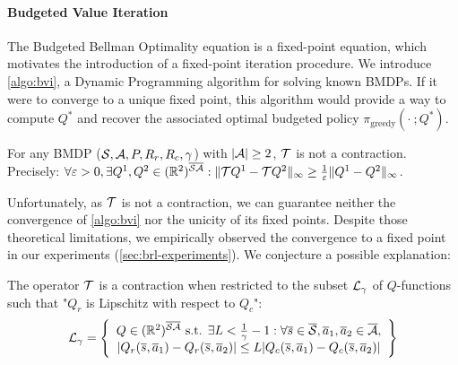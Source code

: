 \paragraph{Budgeted Value Iteration}

The Budgeted Bellman Optimality equation is a fixed-point equation, which motivates the introduction of a fixed-point iteration procedure. We introduce \autoref{algo:bvi}, a Dynamic Programming algorithm for solving known BMDPs. If it were to converge to a unique fixed point, this algorithm would provide a way to compute $Q^*$ and recover the associated optimal budgeted policy $\pi_\text{greedy}(\cdot~; Q^*)$.

\begin{theorem}
	\begin{leftbar}[theorembar]
	\label{thm:contraction}
	For any BMDP ($\mathcal{S},\mathcal{A},P,R_r,R_c,\gamma$) with $|\mathcal{A}| \geq 2$, $\mathcal{T}$ is not a contraction. Precisely: $\forall\varepsilon>0, \exists Q^1,Q^2\in(\mathbb{R}^2)^{\overline{\mathcal{S}}\overline{\mathcal{A}}}:\|\mathcal{T} Q^1-\mathcal{T} Q^2\|_\infty \geq \frac{1}{\varepsilon}\|Q^1-Q^2\|_\infty$.
	\end{leftbar}
\end{theorem}

Unfortunately, as $\mathcal{T}$ is not a contraction, we can guarantee neither the convergence of \autoref{algo:bvi} nor the unicity of its fixed points. Despite those theoretical limitations, we empirically observed the convergence to a fixed point in our experiments (\autoref{sec:brl-experiments}). We conjecture a possible explanation:

\begin{theorem}
	\begin{leftbar}[theorembar]
	\label{rmk:contractivity-smooth}
	The operator $\mathcal{T}$ is a contraction when restricted to the subset $\mathcal{L}_\gamma$ of $Q$-functions such that "$Q_r$ is Lipschitz with respect to $Q_c$":
	\begin{equation}
	\mathcal{L}_\gamma = \left\{\begin{array}{cc}
	Q\in(\mathbb{R}^2)^{\overline{\mathcal{S}}\overline{\mathcal{A}}}\text{ s.t. }\exists L<\frac{1}{\gamma}-1: \forall \overline{s}\in\overline{\mathcal{S}},\overline{a}_1,\overline{a}_2\in\overline{\mathcal{A}},   \\
	|Q_r(\overline{s},\overline{a}_1) - Q_r(\overline{s},\overline{a}_2)| \leq L|Q_c(\overline{s},\overline{a}_1) - Q_c(\overline{s},\overline{a}_2)|
	\end{array}\right\}
	\end{equation}
	\end{leftbar}
\end{theorem}

